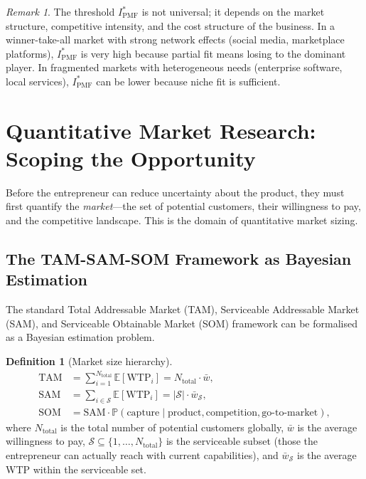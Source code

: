 \documentclass[12pt,a4paper,oneside]{book}
\theoremstyle{definition}
\newtheorem{definition}[theorem]{Definition}
\theoremstyle{remark}
\newtheorem{remark}[theorem]{Remark}
\newcommand{\E}{\mathbb{E}}
\newcommand{\Prob}{\mathbb{P}}
\begin{document}
\begin{remark}
The threshold $I^*_{\text{PMF}}$ is not universal; it depends on the market structure,
competitive intensity, and the cost structure of the business. In a winner-take-all
market with strong network effects (social media, marketplace platforms), $I^*_{\text{PMF}}$
is very high because partial fit means losing to the dominant player. In fragmented
markets with heterogeneous needs (enterprise software, local services), $I^*_{\text{PMF}}$
can be lower because niche fit is sufficient.
\end{remark}

\section{Quantitative Market Research: Scoping the Opportunity}\label{sec:market_research}

Before the entrepreneur can reduce uncertainty about the product, they must first
quantify the \emph{market}---the set of potential customers, their willingness to pay,
and the competitive landscape. This is the domain of quantitative market sizing.

\subsection{The TAM-SAM-SOM Framework as Bayesian Estimation}

The standard Total Addressable Market (TAM), Serviceable Addressable Market (SAM), and
Serviceable Obtainable Market (SOM) framework can be formalised as a Bayesian estimation
problem.

\begin{definition}[Market size hierarchy]
\begin{align}
  \text{TAM} &= \sum_{i=1}^{N_{\text{total}}} \E[\text{WTP}_i]
    = N_{\text{total}} \cdot \bar{w}, \label{eq:tam} \\
  \text{SAM} &= \sum_{i \in \mathcal{S}} \E[\text{WTP}_i]
    = |\mathcal{S}| \cdot \bar{w}_{\mathcal{S}}, \label{eq:sam} \\
  \text{SOM} &= \text{SAM} \cdot \Prob(\text{capture} \mid
    \text{product}, \text{competition}, \text{go-to-market}), \label{eq:som}
\end{align}
where $N_{\text{total}}$ is the total number of potential customers globally,
$\bar{w}$ is the average willingness to pay, $\mathcal{S} \subseteq \{1, \ldots,
N_{\text{total}}\}$ is the serviceable subset (those the entrepreneur can actually reach
with current capabilities), and $\bar{w}_{\mathcal{S}}$ is the average WTP within the
serviceable set.
\end{definition}
\end{document}
